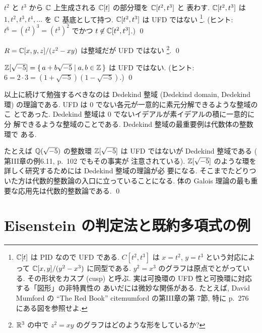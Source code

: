 \documentclass[12pt,twoside]{jarticle}
\begin{document}
\begin{question}
  $t^2$ と $t^3$ から ${\mathbb C}$ 上生成される ${\mathbb C}[t]$ の部分環を ${\mathbb C}[t^2,t^3]$ と
  表わす. ${\mathbb C}[t^2,t^3]$ は $1,t^2,t^3,t^4,\ldots$ を ${\mathbb C}$ 基底として持つ.
  ${\mathbb C}[t^2,t^3]$ は UFD ではない%
  \footnote{${\mathbb C}[t]$ は PID なので UFD である.  
    $C[t^2,t^3]$ は $x=t^2$, $y=t^3$ という対応によって ${\mathbb C}[x,y]/(y^2-x^3)$ 
    に同型である.  $y^2=x^3$ のグラフは原点でとがっている.  その形状をカスプ 
    (cusp) と呼ぶ. 実は可換環の UFD 性と可換環に対応する「図形」の非特異性の
    あいだには微妙な関係がある. 
    たとえば, David Mumford の ``The Red Book'' cite{mumford} の第III章の第
    7節, 特に p.~276 にある図を参照せよ.}.  
  (ヒント: $t^6=(t^2)^3=(t^3)^2$ でかつ $t\not\in{\mathbb C}[t^2,t^3]$.) \qed
\end{question}

\begin{question}
  $R = {\mathbb C}[x,y,z]/(z^2 - xy)$ は整域だが UFD ではない%
  \footnote{${\mathbb R}^3$ の中で $z^2 = xy$ のグラフはどのような形をしているか?}. \qed
\end{question}

\begin{question}
  ${\mathbb Z}[\sqrt{-5}] = \{\,a+b\sqrt{-5}\mid a,b\in{\mathbb Z}\,\}$ は UFD ではない.
  (ヒント: $6=2\cdot 3=(1+\sqrt{-5})(1-\sqrt{-5})$.)
  \qed
\end{question}

\begin{guide}
  以上に続けて勉強するべきなのは Dedekind 整域 (Dedekind domain, Dedekind 環)
  の理論である. UFD は $0$ でない各元が一意的に素元分解できるような整域のこ
  とであった. Dedekind 整域は $0$ でないイデアルが素イデアルの積に一意的に分
  解できるような整域のことである. Dedekind 整域の最重要例は代数体の整数環で
  ある.
  
  たとえば ${\mathbb Q}(\sqrt{-5})$ の整数環 ${\mathbb Z}[\sqrt{-5}]$ は UFD ではないが 
  Dedekind 整域である (\cite{morita} 第III章の例6.11, p.~102 でもその事実が
  注意されている).
  ${\mathbb Z}[\sqrt{-5}]$ のような環を詳しく研究するためには Dedekind 整域の理論が必
  要になる. そこまでたどりついた方は代数的整数論の入口に立っていることになる.
  体の Galois 理論の最も重要な応用先は代数的整数論である.
  \qed
\end{guide}


\section{Eisenstein の判定法と既約多項式の例}
\end{document}
